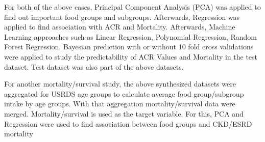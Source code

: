 \medskip 
\noindent For both of the above cases, Principal Component Analysis (PCA) was applied to find out important food groups and subgroups. Afterwards, Regression was applied to find association with ACR and Mortality. Afterwards, Machine Learning approaches such as Linear Regression, Polynomial Regression, Random Forest Regression, Bayesian prediction with or without 10 fold cross validations were applied to study the predictability of ACR Values and Mortality in the test dataset. Test dataset was also part of the above datasets.

\medskip
\noindent For another mortality/survival study, the above synthesized datasets were aggregated for USRDS age groups to calculate average food group/subgroup intake by age groups. With that aggregation mortality/survival data were merged. Mortality/survival is used as the target variable. For this, PCA and Regression were used to find association between food groups and CKD/ESRD mortality
